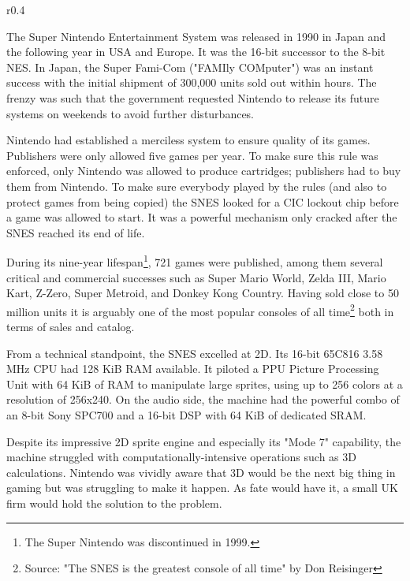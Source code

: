 \begin{wrapfigure}[3]{r}{0.4\textwidth}{
\centering {}}
\end{wrapfigure}
The Super Nintendo Entertainment System was released in 1990 in Japan and the following year in USA and Europe. It was the 16-bit successor to the 8-bit NES. In Japan, the Super Fami-Com ("FAMIly COMputer") was an instant success with the initial shipment of 300,000 units sold out within hours. The frenzy was such that the government requested Nintendo to release its future systems on weekends to avoid further disturbances.\\
\par
Nintendo had established a merciless system to ensure quality of its games. Publishers were only allowed five games per year. To make sure this rule was enforced, only Nintendo was allowed to produce cartridges; publishers had to buy them from Nintendo. To make sure everybody played by the rules (and also to protect games from being copied) the SNES looked for a CIC lockout chip before a game was allowed to start. It was a powerful mechanism only cracked after the SNES reached its end of life.\\
\par
During its nine-year lifespan\footnote{The Super Nintendo was discontinued in 1999.}, 721 games were published, among them several critical and commercial successes such as Super Mario World, Zelda III, Mario Kart, Z-Zero, Super Metroid, and Donkey Kong Country. Having sold close to 50 million units it is arguably one of the most popular consoles of all time\footnote{Source: "The SNES is the greatest console of all time" by Don Reisinger} both in terms of sales and catalog.\\
\par
{}
\par
From a technical standpoint, the SNES excelled at 2D. Its 16-bit 65C816 3.58 MHz CPU had 128 KiB RAM available. It piloted a PPU Picture Processing Unit with 64 KiB of RAM to manipulate large sprites, using up to 256 colors at a resolution of 256x240. On the audio side, the machine had the powerful combo of an 8-bit Sony SPC700 and a 16-bit DSP with 64 KiB of dedicated SRAM.\\
\par

Despite its impressive 2D sprite engine and especially its "Mode 7" capability, the machine struggled with computationally-intensive operations such as 3D calculations. Nintendo was vividly aware that 3D would be the next big thing in gaming but was struggling to make it happen. As fate would have it, a small UK firm would hold the solution to the problem.\\

